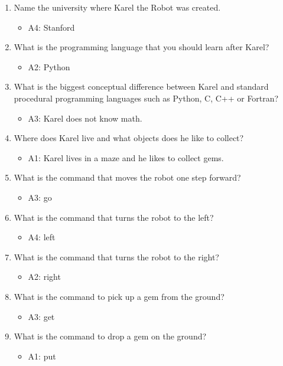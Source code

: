 \documentclass[article,A4,12pt]{llncs}
\begin{document}
\begin{enumerate}
\item Name the university where Karel the Robot was created.
  \begin{itemize}
    \item A4: Stanford
  \end{itemize}
\item What is the programming language that you should learn after Karel?
  \begin{itemize}
    \item A2: Python
  \end{itemize}
\item What is the biggest conceptual difference between Karel and standard
      procedural programming languages such as Python, C, C++ or Fortran?
  \begin{itemize}
    \item A3: Karel does not know math.
  \end{itemize}
\item Where does Karel live and what objects does he like to collect?
  \begin{itemize}
    \item A1: Karel lives in a maze and he likes to collect gems.
  \end{itemize}
\item What is the command that moves the robot one step forward?
  \begin{itemize}
    \item A3: go
  \end{itemize}
\item What is the command that turns the robot to the left?
  \begin{itemize}
    \item A4: left
  \end{itemize}
\item What is the command that turns the robot to the right?
  \begin{itemize}
    \item A2: right
  \end{itemize}
\item What is the command to pick up a gem from the ground?
  \begin{itemize}
    \item A3: get
  \end{itemize}
\item What is the command to drop a gem on the ground?
  \begin{itemize}
    \item A1: put

\end{itemize}
\end{enumerate}
\end{document}
